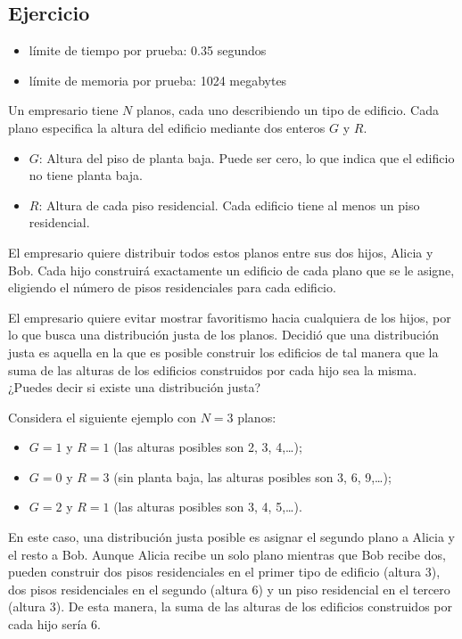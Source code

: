\documentclass{article}
\begin{document}
\subsection{Ejercicio}

\begin{itemize}
    \item límite de tiempo por prueba: 0.35 segundos
    \item límite de memoria por prueba: 1024 megabytes
\end{itemize}

Un empresario tiene $N$ planos, cada uno describiendo un tipo de edificio. Cada plano especifica la altura del edificio mediante dos enteros $G$ y $R$.

\begin{itemize}
    \item $G$: Altura del piso de planta baja. Puede ser cero, lo que indica que el edificio no tiene planta baja.
    \item $R$: Altura de cada piso residencial. Cada edificio tiene al menos un piso residencial.
\end{itemize}

El empresario quiere distribuir todos estos planos entre sus dos hijos, Alicia y Bob. Cada hijo construirá exactamente un edificio de cada plano que se le asigne, eligiendo el número de pisos residenciales para cada edificio.

El empresario quiere evitar mostrar favoritismo hacia cualquiera de los hijos, por lo que busca una distribución justa de los planos. Decidió que una distribución justa es aquella en la que es posible construir los edificios de tal manera que la suma de las alturas de los edificios construidos por cada hijo sea la misma. ¿Puedes decir si existe una distribución justa?

Considera el siguiente ejemplo con $N=3$ planos:

\begin{itemize}
    \item $G=1$ y $R=1$ (las alturas posibles son 2, 3, 4,…);
    \item $G=0$ y $R=3$ (sin planta baja, las alturas posibles son 3, 6, 9,…);
    \item $G=2$ y $R=1$ (las alturas posibles son 3, 4, 5,…).
\end{itemize}

En este caso, una distribución justa posible es asignar el segundo plano a Alicia y el resto a Bob.
Aunque Alicia recibe un solo plano mientras que Bob recibe dos, pueden construir dos pisos residenciales en el primer tipo de edificio (altura 3), dos pisos residenciales en el segundo (altura 6) y un piso residencial en el tercero (altura 3). De esta manera, la suma de las alturas de los edificios construidos por cada hijo sería 6.\\
\end{document}
